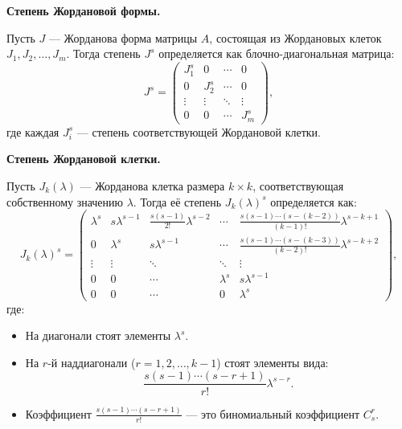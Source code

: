 \begin{shdef}
    \begin{definition}
        \textbf{Степень Жордановой формы.} 
        
        Пусть \( J \) — Жорданова форма матрицы \( A \), состоящая из Жордановых клеток \( J_1, J_2, \ldots, J_m \). Тогда степень \( J^s \) определяется как блочно-диагональная матрица:
        \[
        J^s = 
        \begin{pmatrix}
        J_1^s & 0 & \cdots & 0 \\
        0 & J_2^s & \cdots & 0 \\
        \vdots & \vdots & \ddots & \vdots \\
        0 & 0 & \cdots & J_m^s
        \end{pmatrix},
        \]
        где каждая \( J_i^s \) — степень соответствующей Жордановой клетки.
    \end{definition}
\end{shdef}


\begin{shdef}
    \begin{definition}
        \textbf{Степень Жордановой клетки.} 
        
        Пусть \( J_k(\lambda) \) — Жорданова клетка размера \( k \times k \), соответствующая собственному значению \( \lambda \). Тогда её степень \( J_k(\lambda)^s \) определяется как:
        \[
        J_k(\lambda)^s = 
        \begin{pmatrix}
        \lambda^s & s \lambda^{s-1} & \frac{s(s-1)}{2!} \lambda^{s-2} & \cdots & \frac{s(s-1)\cdots(s-(k-2))}{(k-1)!} \lambda^{s-k+1} \\
        0 & \lambda^s & s \lambda^{s-1} & \cdots & \frac{s(s-1)\cdots(s-(k-3))}{(k-2)!} \lambda^{s-k+2} \\
        \vdots & \vdots & \ddots & \ddots & \vdots \\
        0 & 0 & \cdots & \lambda^s & s \lambda^{s-1} \\
        0 & 0 & \cdots & 0 & \lambda^s
        \end{pmatrix},
        \]
        где:
        \begin{itemize}
            \item На диагонали стоят элементы \( \lambda^s \).
            \item На \( r \)-й наддиагонали (\( r = 1, 2, \ldots, k-1 \)) стоят элементы вида:
            \[
            \frac{s(s-1)\cdots(s-r+1)}{r!} \lambda^{s-r}.
            \]
            \item Коэффициент \( \frac{s(s-1)\cdots(s-r+1)}{r!} \) — это биномиальный коэффициент \( C_s^r \).
        \end{itemize}
    \end{definition}
\end{shdef}

